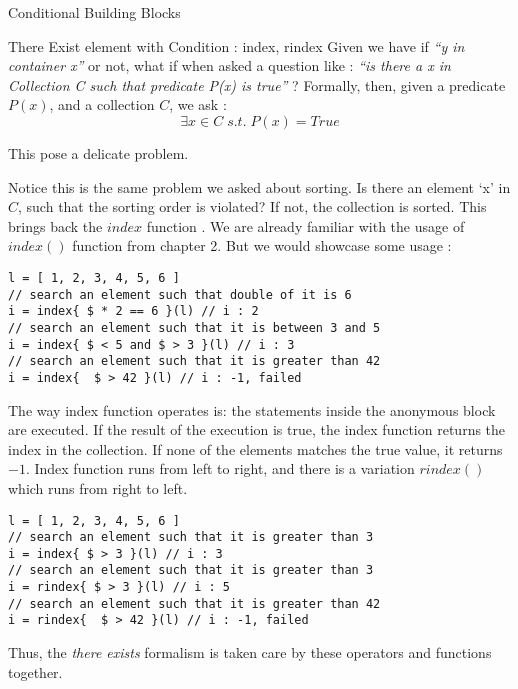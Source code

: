 \begin{section}{Conditional Building Blocks}
\begin{subsection}{There Exist element with Condition : index, rindex }
Given we have if \emph{``y in container x''} or not,
what if when asked a question like : \emph{ ``is there a x in Collection C such that predicate P(x) is true''} ?
Formally, then, given a predicate $P(x)$, and a collection $C$, we ask :
$$
\exists x \in C \;s.t.\; P(x) = True
$$

This pose a delicate problem. 

Notice this is the same problem we asked about sorting. Is there an element `x' in $C$, 
such that the sorting order is violated? If not, the collection is sorted.
This brings back the $index$ function .
We are already familiar with the usage of $index()$ function from chapter 2.
But we would showcase some usage :
 
\begin{lstlisting}[style=JexlStyle]
l = [ 1, 2, 3, 4, 5, 6 ]
// search an element such that double of it is 6
i = index{ $ * 2 == 6 }(l) // i : 2 
// search an element such that it is between 3 and 5 
i = index{ $ < 5 and $ > 3 }(l) // i : 3 
// search an element such that it is greater than 42
i = index{  $ > 42 }(l) // i : -1, failed 
\end{lstlisting}

The way index function operates is: the statements inside the anonymous block are executed.
If the result of the execution is true, the index function returns the index in the collection.
If none of the elements matches the true value, it returns $-1$.
Index function runs from left to right, and there is a variation $rindex()$ 
which runs from right to left.


\begin{lstlisting}[style=JexlStyle]
l = [ 1, 2, 3, 4, 5, 6 ]
// search an element such that it is greater than 3  
i = index{ $ > 3 }(l) // i : 3
// search an element such that it is greater than 3  
i = rindex{ $ > 3 }(l) // i : 5 
// search an element such that it is greater than 42
i = rindex{  $ > 42 }(l) // i : -1, failed 
\end{lstlisting}

Thus, the \emph{there exists} formalism is taken care by these operators and functions together.

\end{subsection}



\end{section}
